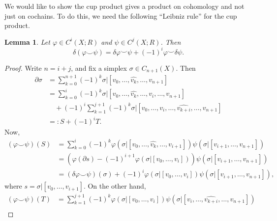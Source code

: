\documentclass{book}
\renewcommand{\phi}{\varphi}
\newtheorem{lemma}[theorem]{Lemma}
\theoremstyle{definition}
\theoremstyle{remark}
\numberwithin{equation}{section}
\begin{document}
We would like to show the cup product gives a product on cohomology and not just on cochains. To do this, we need the following ``Leibniz rule'' for the cup product.
\begin{lemma}
    Let $\phi \in C^i(X;R)$ and $\psi \in C^j(X;R)$. Then 
    \begin{equation}
        \delta(\phi \smile \psi) = \delta\phi \smile \psi + (-1)^i \phi \smile \delta\psi.
    \end{equation}
\end{lemma}
\begin{proof}
    Write $n = i + j$, and fix a simplex $\sigma \in C_{n+1}(X)$. Then 
    \begin{equation} \begin{aligned}
        \partial\sigma &= \sum_{k=0}^{n+1} (-1)^k \sigma \vert [v_0,\dots,\widehat{v_k},\dots,v_{n+1}]\\
                       &= \sum_{k=0}^i (-1)^k \sigma \vert [v_0,\dots,\widehat{v_k},\dots,v_i,\dots,v_{n+1}] \\
                       &\quad + (-1)^{i} \sum_{k=1}^{j+1} (-1)^k \sigma \vert [v_0,\dots,v_i,\dots,\widehat{v_{k+i}},\dots,v_{n+1}] \\
                       &=: S + (-1)^i T.
    \end{aligned} \end{equation}
    Now,
    \begin{equation} \begin{aligned}
        (\phi \smile \psi)(S) &= \sum_{k=0}^i (-1)^k \phi(\sigma \vert [v_0,\dots,\widehat{v_k},\dots,v_{i+1}]) 
                                                     \psi(\sigma \vert [v_{i+1},\dots,v_{n+1}]) \\
                              &= (\phi(\partial s) - (-1)^{i+1} \phi(\sigma \vert [v_0,\dots,v_i])) \psi(\sigma \vert [v_{i+1},\dots,v_{n+1}]) \\
                              &= (\delta\phi \smile \psi)(\sigma) + (-1)^i \phi(\sigma \vert [v_0,\dots,v_i]) \psi(\sigma \vert [v_{i+1},\dots,v_{n+1}]),
    \end{aligned} \end{equation}
    where $s = \sigma \vert [v_0,\dots,v_{i+1}]$. On the other hand,
    \begin{equation} \begin{aligned}
        (\phi \smile \psi)(T) &= \sum_{k=1}^{j+1} (-1)^k \phi(\sigma \vert [v_0,\dots,v_i]) 
                                                         \psi(\sigma \vert [v_i,\dots,\widehat{v_{k+i}},\dots,v_{n+1}]) \\

\end{aligned}
\end{equation}
\end{proof}
\end{document}
